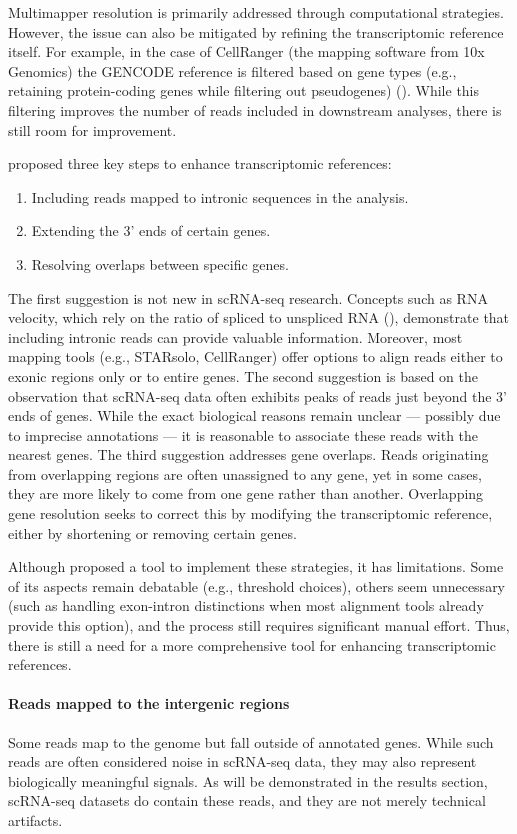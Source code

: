 Multimapper resolution is primarily addressed through computational strategies.
However, the issue can also be mitigated by refining the transcriptomic reference itself.
For example, in the case of CellRanger (the mapping software from 10x Genomics)
the GENCODE reference is filtered based on gene types (e.g., retaining protein-coding genes while filtering out pseudogenes) (\cite{10xRef}).
While this filtering improves the number of reads included in downstream analyses, there is still room for improvement.

\textcite{Pool2023} proposed three key steps to enhance transcriptomic references:
\begin{enumerate}
  \item Including reads mapped to intronic sequences in the analysis.
  \item Extending the 3' ends of certain genes.
  \item Resolving overlaps between specific genes.
\end{enumerate}
The first suggestion is not new in scRNA-seq research.
Concepts such as RNA velocity, which rely on the ratio of spliced to unspliced RNA (\cite{Manno2018}),
demonstrate that including intronic reads can provide valuable information.
Moreover, most mapping tools (e.g., STARsolo, CellRanger) offer options to align reads either to exonic regions only or to entire genes.
The second suggestion is based on the observation that scRNA-seq data often exhibits peaks of reads just beyond the 3' ends of genes.
While the exact biological reasons remain unclear — possibly due to imprecise annotations —
it is reasonable to associate these reads with the nearest genes.
The third suggestion addresses gene overlaps.
Reads originating from overlapping regions are often unassigned to any gene,
yet in some cases, they are more likely to come from one gene rather than another.
Overlapping gene resolution seeks to correct this by modifying the transcriptomic reference, either by shortening or removing certain genes.

Although \textcite{Pool2023} proposed a tool to implement these strategies, it has limitations.
Some of its aspects remain debatable (e.g., threshold choices), others seem unnecessary
(such as handling exon-intron distinctions when most alignment tools already provide this option),
and the process still requires significant manual effort.
Thus, there is still a need for a more comprehensive tool for enhancing transcriptomic references.

\paragraph{Reads mapped to the intergenic regions}
Some reads map to the genome but fall outside of annotated genes.
While such reads are often considered noise in scRNA-seq data, they may also represent biologically meaningful signals.
As will be demonstrated in the results section,
scRNA-seq datasets do contain these reads, and they are not merely technical artifacts.
